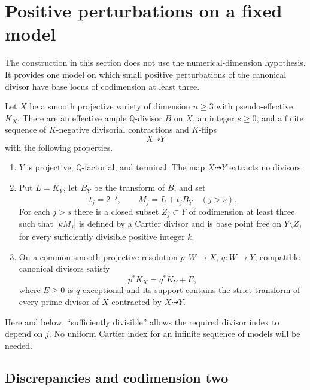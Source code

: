 \section{Positive perturbations on a fixed model}
\label{mmp:section}

The construction in this section does not use the numerical-dimension
hypothesis.  It provides one model on which small positive perturbations
of the canonical divisor have base locus of codimension at least three.

\begin{proposition}\label{mmp:approximation}
Let $X$ be a smooth projective variety of dimension $n\geq 3$ with
pseudo-effective $K_X$.  There are an effective ample $\mathbb Q$-divisor
$B$ on $X$, an integer $s\geq 0$, and a finite sequence of
$K$-negative divisorial contractions and $K$-flips
\[
 X\dashrightarrow Y
\]
with the following properties.
\begin{enumerate}[label=\textup{(\roman*)}]
\item $Y$ is projective, $\mathbb Q$-factorial, and terminal.  The map
$X\dashrightarrow Y$ extracts no divisors.
\item Put $L=K_Y$, let $B_Y$ be the transform of $B$, and set
\[
 t_j=2^{-j},\qquad M_j=L+t_jB_Y\quad (j>s).
\]
For each $j>s$ there is a closed subset $Z_j\subset Y$ of codimension
at least three such that $|kM_j|$ is defined by a Cartier divisor and
is base point free on $Y\setminus Z_j$ for every sufficiently divisible
positive integer $k$.
\item On a common smooth projective resolution
$p:W\to X$, $q:W\to Y$, compatible canonical divisors satisfy
\begin{equation}\label{mmp:comparison}
 p^*K_X=q^*K_Y+E,
\end{equation}
where $E\geq 0$ is $q$-exceptional and its support contains the strict
transform of every prime divisor of $X$ contracted by $X\dashrightarrow Y$.
\end{enumerate}
\end{proposition}

Here and below, ``sufficiently divisible'' allows the required divisor
index to depend on $j$.  No uniform Cartier index for an infinite
sequence of models will be needed.

\subsection{Discrepancies and codimension two}

